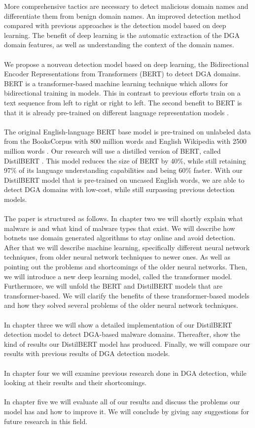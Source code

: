 More comprehensive tactics are necessary to detect malicious domain names and differentiate them from benign domain names. An improved detection method compared with previous approaches is the detection model based on deep learning. The benefit of deep learning is the automatic extraction of the DGA domain features, as well as understanding the context of the domain names.\\\\ We propose a nouveau detection model based on deep learning, the Bidirectional Encoder Representations from Transformers (BERT) to detect DGA domains. BERT is a transformer-based machine learning technique which allows for bidirectional training in models. This in contrast to previous efforts train on a text sequence from left to right or right to left. The second benefit to BERT is that it is already pre-trained on different language representation models \cite{DBLP:journals/corr/abs-1810-04805}. \\\\ 
The original English-language BERT base model is pre-trained on unlabeled data from the BooksCorpus \cite{BooksCorpus} with 800 million words and English Wikipedia with 2500 million words \cite{ColBERT}. Our research will use a distilled version of BERT, called DistilBERT \cite{Sanh2019DistilBERTAD}. This model reduces the size of BERT by 40\%, while still retaining 97\% of its language understanding capabilities and being 60\% faster. With our DistilBERT model that is pre-trained on uncased English words, we are able to detect DGA domains with low-cost, while still surpassing previous detection models.
\pagebreak
\\\\
The paper is structured as follows. In chapter two we will shortly explain what malware is and what kind of malware types that exist. We will describe how botnets use domain generated algorithms to stay online and avoid detection. After that we will describe machine learning, specifically different neural network techniques, from older neural network techniques to newer ones. As well as pointing out the problems and shortcomings of the older neural networks. Then, we will introduce a new deep learning model, called the transformer model. Furthermore, we will unfold the BERT and DistilBERT models that are transformer-based. We will clarify the benefits of these transformer-based models and how they solved several problems of the older neural network techniques. \\\\
In chapter three we will show a detailed implementation of our DistilBERT detection model to detect DGA-based malware domains. Thereafter, show the kind of results our DistilBERT model has produced. Finally, we will compare our results with previous results of DGA detection models.\\\\
In chapter four we will examine previous research done in DGA detection, while looking at their results and their shortcomings.\\\\
In chapter five we will evaluate all of our results and discuss the problems our model has and how to improve it. We will conclude by giving any suggestions for future research in this field.